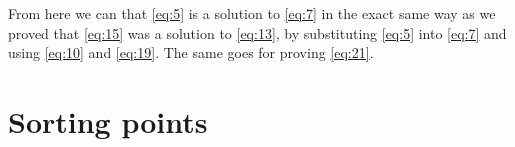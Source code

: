 %
From here we can that \cref{eq:5} is a solution to \cref{eq:7} in the exact same way as
we proved that \cref{eq:15} was a solution to \cref{eq:13}, by substituting
\cref{eq:5} into \cref{eq:7} and using \cref{eq:10} and \cref{eq:19}. The same
goes for proving \cref{eq:21}.

\section{Sorting points}
\label{sec:sorting-points}


\chapterbreak{}

